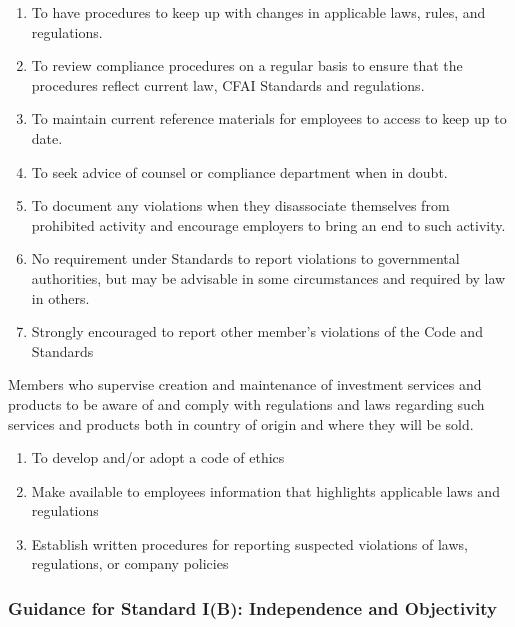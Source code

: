 \begin{remark} 
\begin{enumerate}[label=\roman*.]
\setlength{\itemsep}{0pt}
\item To have procedures to keep up with changes in applicable laws, rules, and regulations.
\item To review compliance procedures on a regular basis to ensure that the procedures reflect current law, CFAI Standards and regulations.
\item To maintain current reference materials for employees to access to keep up to date.
\item To seek advice of counsel or compliance department when in doubt.
\item To document any violations when they disassociate themselves from prohibited activity and encourage employers to bring an end to such activity.
\item No requirement under Standards to report violations to governmental authorities, but may be advisable in some circumstances and required by law in others.
\item Strongly encouraged to report other member's violations of the Code and Standards
\end{enumerate}
Members who supervise creation and maintenance of investment services and products to be aware of and comply with regulations and laws regarding such services and products both in country of origin and where they will be sold.
\end{remark}

\begin{remark} 
\begin{enumerate}[label=\roman*.]
\setlength{\itemsep}{0pt}
\item To develop and/or adopt a code of ethics
\item Make available to employees information that highlights applicable laws and regulations
\item Establish written procedures for reporting suspected violations of laws, regulations, or company policies
\end{enumerate}
\end{remark}

\subsubsection{Guidance for Standard I(B): Independence and Objectivity}

